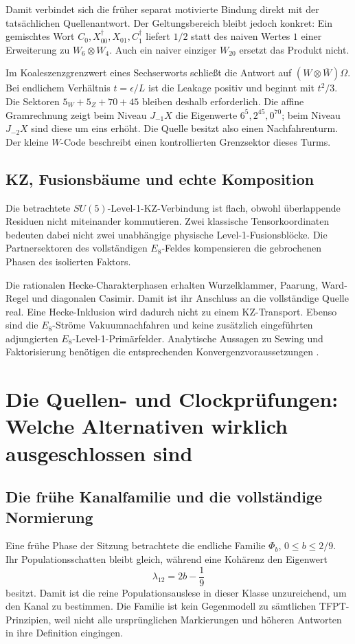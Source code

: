 Damit verbindet sich die früher separat motivierte Bindung direkt mit der tatsächlichen Quellenantwort. Der Geltungsbereich bleibt jedoch konkret: Ein gemischtes Wort $C_0,X_{00}^\dagger,X_{01},C_1^\dagger$ liefert $1/2$ statt des naiven Wertes $1$ einer Erweiterung zu $W_6\otimes W_4$. Auch ein naiver einziger $W_{20}$ ersetzt das Produkt nicht.

Im Koaleszenzgrenzwert eines Sechserworts schließt die Antwort auf $(W\otimes\overline W)\Omega$. Bei endlichem Verhältnis $t=\epsilon/L$ ist die Leakage positiv und beginnt mit $t^2/3$. Die Sektoren $5_W+5_Z+70+45$ bleiben deshalb erforderlich. Die affine Gramrechnung zeigt beim Niveau $J_{-1}X$ die Eigenwerte $6^5,2^{45},0^{70}$; beim Niveau $J_{-2}X$ sind diese um eins erhöht. Die Quelle besitzt also einen Nachfahrenturm. Der kleine $W$-Code beschreibt einen kontrollierten Grenzsektor dieses Turms.

\subsection{KZ, Fusionsbäume und echte Komposition}
Die betrachtete $SU(5)$-Level-1-KZ-Verbindung ist flach, obwohl überlappende Residuen nicht miteinander kommutieren. Zwei klassische Tensorkoordinaten bedeuten dabei nicht zwei unabhängige physische Level-1-Fusionsblöcke. Die Partnersektoren des vollständigen $E_8$-Feldes kompensieren die gebrochenen Phasen des isolierten Faktors.

Die rationalen Hecke-Charakterphasen erhalten Wurzelklammer, Paarung, Ward-Regel und diagonalen Casimir. Damit ist ihr Anschluss an die vollständige Quelle real. Eine Hecke-Inklusion wird dadurch nicht zu einem KZ-Transport. Ebenso sind die $E_8$-Ströme Vakuumnachfahren und keine zusätzlich eingeführten adjungierten $E_8$-Level-1-Primärfelder. Analytische Aussagen zu Sewing und Faktorisierung benötigen die entsprechenden Konvergenzvoraussetzungen \cite{gui,guizhang}.

\section{Die Quellen- und Clockprüfungen: Welche Alternativen wirklich ausgeschlossen sind}

\subsection{Die frühe Kanalfamilie und die vollständige Normierung}
Eine frühe Phase der Sitzung betrachtete die endliche Familie $\Phi_b$, $0\le b\le2/9$. Ihr Populationsschatten bleibt gleich, während eine Kohärenz den Eigenwert
\begin{equation}
\lambda_{12}=2b-\frac19
\end{equation}
besitzt. Damit ist die reine Populationsauslese in dieser Klasse unzureichend, um den Kanal zu bestimmen. Die Familie ist kein Gegenmodell zu sämtlichen TFPT-Prinzipien, weil nicht alle ursprünglichen Markierungen und höheren Antworten in ihre Definition eingingen.


